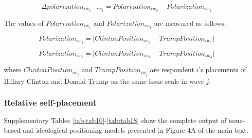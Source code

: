 \documentclass[
  12pt,
]{article}
\begin{document}
\[\Delta polarization_{{iw_{3}}-{iw_{1}}} = Polarization_{iw_{3}} - Polarization_{iw_{1}}\]

The values of \(Polarization_{iw_{1}}\) and \(Polarization_{iw_{3}}\) are measured as follows:

\[Polarization_{iw_{1}} = \lvert ClintonPosition_{iw_{1}} - TrumpPosition_{iw_{1}} \rvert\]

\[Polarization_{iw_{3}} = \lvert ClintonPosition_{iw_{3}} - TrumpPosition_{iw_{3}} \rvert\]

where \(ClintonPosition_{iw_{j}}\) and \(TrumpPosition_{iw_{j}}\) are respondent \(i\)'s placements of Hillary Clinton and Donald Trump on the same issue scale in wave \(j\).

\clearpage

\hypertarget{relative-self-placement}{%
\subsubsection{Relative self-placement}\label{relative-self-placement}}

Supplementary Tables \ref{tab:tab10}-\ref{tab:tab18} show the complete output of issue-based and ideological positioning models presented in Figure 4A of the main text.
\end{document}
